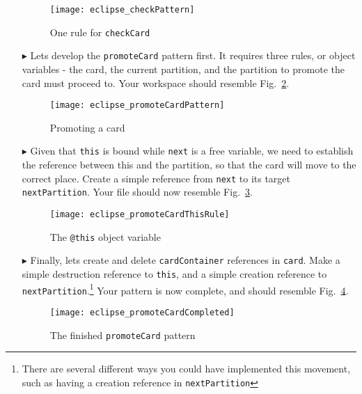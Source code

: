 \begin{itemize}
\begin{figure}[htbp]
\begin{center}
  \texttt{[image: eclipse\_checkPattern]}
  \caption{One rule for \texttt{checkCard}}
  \label{fig:checkPattern}
\end{center}
\end{figure} 

\item[$\blacktriangleright$] Lets develop the \texttt{promoteCard} pattern first. It requires three rules, or object variables - the card, the current
partition, and the partition to promote the card must proceed to. Your workspace should resemble Fig.~\ref{fig:promoteCardPattern}.

\begin{figure}[htbp]
\begin{center}
  \texttt{[image: eclipse\_promoteCardPattern]}
  \caption{Promoting a card}
  \label{fig:promoteCardPattern}
\end{center}
\end{figure} 

\item[$\blacktriangleright$] Given that \texttt{this} is bound while \texttt{next} is a free variable, we need to establish the reference between this and the
partition, so that the card will move to the correct place. Create a simple reference from \texttt{next} to its target \texttt{nextPartition}. Your file should
now resemble Fig.~\ref{fig:promoteThisRule}.

\begin{figure}[htbp]
\begin{center}
  \texttt{[image: eclipse\_promoteCardThisRule]}
  \caption{The \texttt{@this} object variable}
  \label{fig:promoteThisRule}
\end{center}
\end{figure} 

\item[$\blacktriangleright$] Finally, lets create and delete \texttt{cardContainer} references in \texttt{card}. Make a simple destruction reference to
\texttt{this}, and a simple creation reference to \texttt{nextPartition}.\footnote{There are several different ways you could have implemented this movement, such as having a
creation reference in \texttt{nextPartition}} Your pattern is now complete, and should resemble Fig.~\ref{fig:completedPromote}.

\begin{figure}[htbp]
\begin{center}
  \texttt{[image: eclipse\_promoteCardCompleted]}
  \caption{The finished \texttt{promoteCard} pattern}
  \label{fig:completedPromote}
\end{center}
\end{figure} 


\end{itemize}

